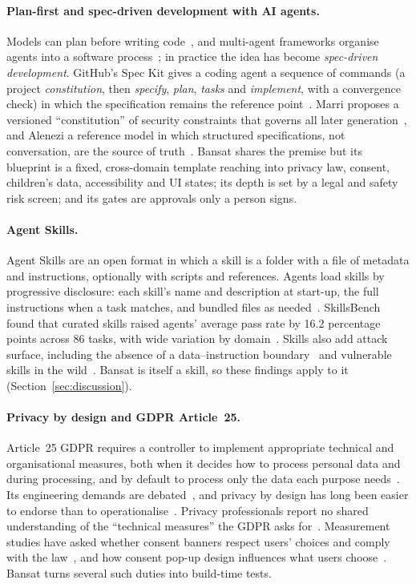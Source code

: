 \documentclass[11pt,a4paper]{article}
\DeclareRobustCommand{\fpath}[1]{\path{#1}}
\begin{document}
\paragraph{Plan-first and spec-driven development with AI agents.}
Models can plan before writing code~\cite{jiang2024selfplanning}, and multi-agent frameworks organise agents into a
software process~\cite{hong2023metagpt,qian2024chatdev}; in practice the idea has become \emph{spec-driven
development}. GitHub's Spec Kit gives a coding agent a sequence of
commands (a project \emph{constitution}, then \emph{specify}, \emph{plan}, \emph{tasks} and \emph{implement}, with a
convergence check) in which the specification remains the reference point~\cite{speckit}. Marri proposes a versioned
``constitution'' of security constraints that governs all later generation~\cite{marri2026csdd}, and Alenezi a reference
model in which structured specifications, not conversation, are the source of truth~\cite{alenezi2026sdd}. Bansat shares
the premise but its blueprint is a fixed, cross-domain template reaching into privacy law, consent, children's data,
accessibility and UI states; its depth is set by a legal and safety risk screen; and its gates are approvals only a
person signs.

\paragraph{Agent Skills.}
Agent Skills are an open format in which a skill is a folder with a \fpath{SKILL.md}
file of metadata and instructions, optionally with scripts and references. Agents load skills by progressive
disclosure: each skill's name and description at start-up, the full instructions when a task matches, and bundled files
as needed~\cite{agentskills}. SkillsBench found that curated skills raised agents' average pass rate by 16.2 percentage
points across 86 tasks, with wide variation by domain~\cite{li2026skillsbench}. Skills also add attack surface, including the absence of a data--instruction boundary~\cite{li2026secureskills} and
vulnerable skills in the wild~\cite{liu2026skillswild}. Bansat is itself a skill, so these findings apply to it (Section~\ref{sec:discussion}).

\paragraph{Privacy by design and GDPR Article~25.}
Article~25 GDPR requires a controller to implement appropriate technical and organisational measures, both when it
decides how to process personal data and during processing, and by default to process only the data each purpose
needs~\cite{gdpr}. Its engineering demands are debated~\cite{bygrave2017dpbd}, and privacy by design has long been easier to endorse
than to operationalise~\cite{spiekermann2012pbd}. Privacy professionals report no shared understanding of the ``technical measures'' the GDPR asks
for~\cite{klymenko2022technical}. Measurement studies have asked whether consent banners respect users'
choices and comply with the law~\cite{matte2020cookie}, and how consent pop-up design influences what users
choose~\cite{nouwens2020dark}. Bansat turns several such duties into build-time tests.
\end{document}
